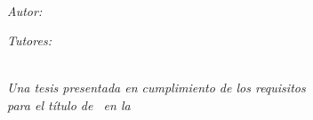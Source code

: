\documentclass[
11pt, %
english, %
spanish,
singlespacing, %
liststotoc, %
parskip, %
headsepline, %
]{MastersDoctoralThesis} %
\begin{document}

\begin{titlepage}
\begin{center}
\vspace*{3cm}

{\huge \ttitle\par}\vspace{1cm} %
\HRule \\[2cm] %

\begin{minipage}[t]{0.4\textwidth}
\begin{flushleft} \large
\emph{Autor:}\\
\href{}{\authorname} %
\end{flushleft}
\end{minipage}
\begin{minipage}[t]{0.4\textwidth}
\begin{flushright} \large
\emph{Tutores:} \\
\href{}{\supname} %
\end{flushright}
\end{minipage}\\[2cm]

\large \textit{Una tesis presentada en cumplimiento de los requisitos\\ para el título de \degreename \ en la}\\[1cm]

\univname\\ %
\facname\\ %
\deptname \\[2cm]

{\large\the\year}\\[1cm] %

\vfill

\end{center}
\end{titlepage}


\end{document}
